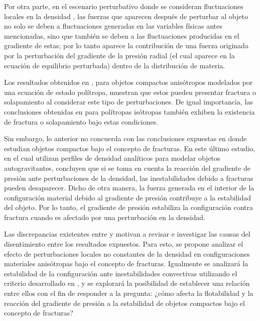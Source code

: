 \documentclass[letterpaper,11pt]{article}
\begin{document}
Por otra parte, en el escenario perturbativo donde se consideran fluctuaciones locales en la densidad \cite{GonzalezNavarroNunez2015,sharif2018cracking}, las fuerzas que aparecen después de perturbar al objeto no solo se deben a fluctuaciones generadas en las variables físicas antes mencionadas, sino que también se deben a las fluctuaciones producidas en el gradiente de estas; por lo tanto aparece la contribución de una fuerza originada por la perturbación del gradiente de la presión radial (el cual aparece en la ecuación de equilibrio perturbada) dentro de la distribución de materia.

Los resultados obtenidos en \cite{sharif2018cracking}, para objetos compactos anisótropos modelados por una ecuación de estado polítropa, muestran que estos pueden presentar fractura o solapamiento al considerar este tipo de perturbaciones. De igual importancia, las conclusiones obtenidas en \cite{GonzalezNavarroNunez2015} para polítropas isótropas también exhiben la existencia de fractura o solapamiento bajo estas condiciones.


Sin embargo, lo anterior no concuerda con las conclusiones expuestas en \cite{hernandez2018convection} donde estudian objetos compactos bajo el concepto de fracturas. En este último estudio, en el cual utilizan perfiles de densidad analíticos para modelar objetos autogravitantes, concluyen que si se toma en cuenta la reacción del gradiente de presión ante perturbaciones de la densidad, las inestabilidades debido a fracturas pueden desaparecer. Dicho de otra manera, la fuerza generada en el interior de la configuración material debido al gradiente de presión contribuye a la estabilidad del objeto. Por lo tanto, el gradiente de presión estabiliza la configuración contra fractura cuando  es afectado por una perturbación en la densidad.

Las discrepancias existentes entre \cite{GonzalezNavarroNunez2015,sharif2018cracking} y \cite{hernandez2018convection} motivan a revisar e investigar las causas del disentimiento entre los resultados expuestos. Para esto, se propone analizar el efecto de perturbaciones locales no constantes de la densidad en configuraciones materiales anisótropas bajo el concepto de fracturas. Igualmente se analizará la estabilidad de la configuración ante inestabilidades convectivas utilizando el criterio desarrollado en \cite{hernandez2018convection}, y se explorará la posibilidad de establecer una relación entre ellos con el fin de responder a la pregunta: ¿cómo afecta la flotabilidad y la reacción del gradiente de presión a la estabilidad de objetos compactos bajo el concepto de fracturas?
\end{document}
